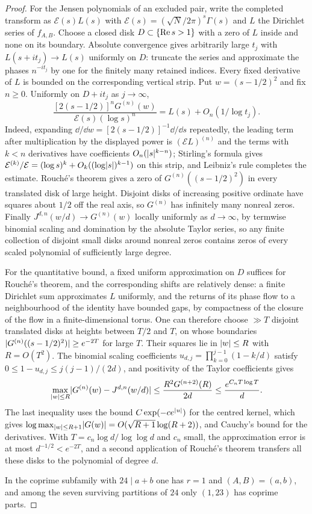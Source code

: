 \begin{proof}
For the Jensen polynomials of an excluded pair, write the completed transform as $\mathcal E(s)L(s)$ with
$\mathcal E(s)=(\sqrt N/2\pi)^s\Gamma(s)$ and $L$ the Dirichlet series of $f_{A,B}$. Choose a closed disk
$D\subset\{\operatorname{Re} s>1\}$ with a zero of $L$ inside and none on its boundary. Absolute convergence gives
arbitrarily large $t_j$ with $L(s+it_j)\to L(s)$ uniformly on $D$: truncate the series and approximate
the phases $n^{-it_j}$ by one for the finitely many retained indices. Every fixed derivative of $L$ is
bounded on the corresponding vertical strip. Put $w=(s-1/2)^2$ and fix $n\ge0$. Uniformly on $D+it_j$ as
$j\to\infty$,
\[
 \frac{[2(s-1/2)]^nG^{(n)}(w)}{\mathcal E(s)(\log s)^n}=L(s)+O_n(1/\log t_j).
\]
Indeed, expanding $\dd/\dd w=[2(s-1/2)]^{-1}\dd/\dd s$ repeatedly, the leading term after multiplication
by the displayed power is $(\mathcal EL)^{(n)}$ and the terms with $k<n$ derivatives have coefficients
$O_n(\lvert s\rvert^{k-n})$; Stirling's formula gives
$\mathcal E^{(k)}/\mathcal E=(\log s)^k+O_k((\log\lvert s\rvert)^{k-1})$ on this strip, and Leibniz's rule
completes the estimate. Rouch\'e's theorem gives a zero of $G^{(n)}((s-1/2)^2)$ in every translated disk
of large height. Disjoint disks of increasing positive ordinate have squares about $1/2$ off the real axis,
so $G^{(n)}$ has infinitely many nonreal zeros. Finally $J^{d,n}(w/d)\to G^{(n)}(w)$ locally uniformly as
$d\to\infty$, by termwise binomial scaling and domination by the absolute Taylor series, so any finite
collection of disjoint small disks around nonreal zeros contains zeros of every scaled polynomial of
sufficiently large degree.

For the quantitative bound, a fixed uniform approximation on $D$ suffices for Rouch\'e's theorem, and the
corresponding shifts are relatively dense: a finite Dirichlet sum approximates $L$ uniformly, and the
returns of its phase flow to a neighbourhood of the identity have bounded gaps, by compactness of the
closure of the flow in a finite-dimensional torus. One can therefore choose $\gg T$ disjoint translated
disks at heights between $T/2$ and $T$, on whose boundaries $\lvert G^{(n)}((s-1/2)^2)\rvert\ge e^{-2T}$ for large
$T$. Their squares lie in $\lvert w\rvert\le R$ with $R=O(T^2)$. The binomial scaling coefficients
$u_{d,j}=\prod_{k=0}^{j-1}(1-k/d)$ satisfy $0\le1-u_{d,j}\le j(j-1)/(2d)$, and positivity of the Taylor
coefficients gives
\[
 \max_{\lvert w\rvert\le R}\lvert G^{(n)}(w)-J^{d,n}(w/d)\rvert\le\frac{R^2G^{(n+2)}(R)}{2d}\le\frac{e^{C_nT\log T}}d .
\]
The last inequality uses the bound $C\exp(-ce^{\lvert u\rvert})$ for the centred kernel, which gives
$\log\max_{\lvert w\rvert\le R+1}\lvert G(w)\rvert=O(\sqrt{R+1}\log(R+2))$, and Cauchy's bound for the derivatives. With
$T=c_n\log d/\log\log d$ and $c_n$ small, the approximation error is at most $d^{-1/2}<e^{-2T}$, and a
second application of Rouch\'e's theorem transfers all these disks to the polynomial of degree $d$.

In the coprime subfamily with $24\mid a+b$ one has $r=1$ and $(A,B)=(a,b)$, and among the seven surviving
partitions of $24$ only $(1,23)$ has coprime parts.
\end{proof}

